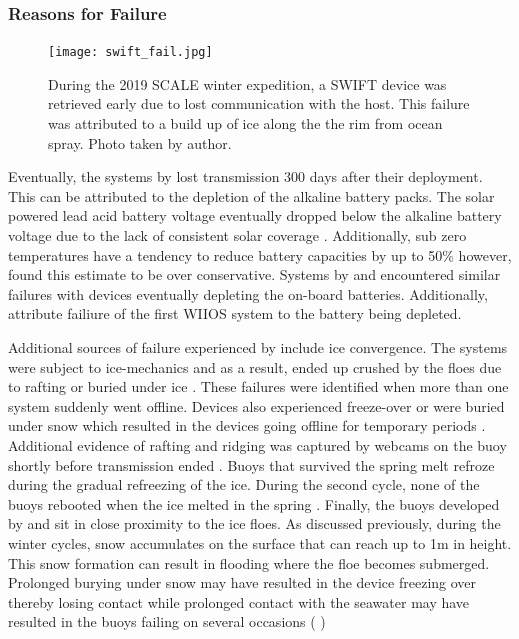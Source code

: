 \subsubsection{Reasons for Failure}
\label{ch2:sec3_failiure}
\begin{figure}
    \centering
    \texttt{[image: swift\_fail.jpg]}
    \caption{During the 2019 SCALE winter expedition, a SWIFT device was retrieved early due to lost communication with the host. This failure was attributed to a build up of ice along the the rim from ocean spray. Photo taken by author.}
    \label{fig:swift_fail}
\end{figure}
Eventually, the systems by \textcite{doble2017robust} lost transmission 300 days after their deployment. This can be attributed to the depletion of the alkaline battery packs. The solar powered lead acid battery voltage eventually dropped below the alkaline battery voltage due to the lack of consistent solar coverage \cite{doble2017robust}. Additionally, sub zero temperatures have a tendency to reduce battery capacities by up to 50\% \cite{doble2017robust} however, \textcite{doble2017robust} found this estimate to be over conservative. Systems by \textcite{kohout2015device} and \textcite{doble2017robust} encountered similar failures with devices eventually depleting the on-board batteries. Additionally, \cite{alberello2019drift} attribute failiure of the first WIIOS system to the battery being depleted.\par 

Additional sources of failure experienced by \textcite{doble2017robust} include ice convergence. The systems were subject to ice-mechanics and as a result, ended up crushed by the floes due to rafting or buried under ice \textcite{doble2017robust}. These failures were identified when more than one system suddenly went offline. Devices also experienced freeze-over or were buried under snow which resulted in the devices going offline for temporary periods \cite{doble2017robust}. Additional evidence of rafting and ridging was captured by webcams on the buoy shortly before transmission ended \cite{doble2017robust}. Buoys that survived the spring melt refroze during the gradual refreezing of the ice. During the second cycle, none of the buoys rebooted when the ice melted in the spring \cite{doble2017robust}. Finally, the buoys developed by \textcite{kohout2015device} and \textcite{rabault2017measurements} sit in close proximity to the ice floes. As discussed previously, during the winter cycles, snow accumulates on the surface that can reach up to 1m in height. This snow formation can result in flooding where the floe becomes submerged. Prolonged burying under snow may have resulted in the device freezing over thereby losing contact while prolonged contact with the seawater may have resulted in the buoys failing on several occasions (\cite{kohout2015device} \cite{vichi2019effects} \cite{albarello2020drift} \cite{rabault2019open})\par 

